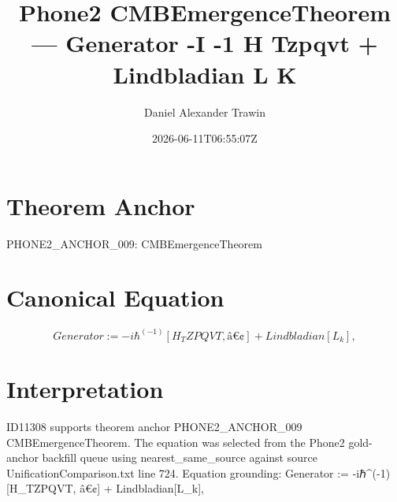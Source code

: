\documentclass[11pt]{article}
\title{Phone2 CMBEmergenceTheorem — Generator -I -1 H Tzpqvt + Lindbladian L K}
\author{Daniel Alexander Trawin}
\date{2026-06-11T06:55:07Z}
\begin{document}
\maketitle
\section*{Theorem Anchor}
PHONE2_ANCHOR_009: CMBEmergenceTheorem
\section*{Canonical Equation}
\[
Generator := -iℏ^(-1)[H_TZPQVT, â€¢] + Lindbladian[{L_k}],
\]
\section*{Interpretation}
ID11308 supports theorem anchor PHONE2_ANCHOR_009 CMBEmergenceTheorem. The equation was selected from the Phone2 gold-anchor backfill queue using nearest_same_source against source UnificationComparison.txt line 724. Equation grounding: Generator := -iℏ^(-1)[H_TZPQVT, â€¢] + Lindbladian[{L_k}],
\end{document}
